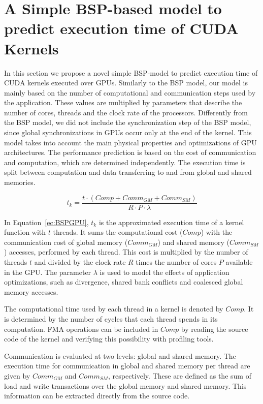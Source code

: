 \section[BSP-based model to predict execution time of CUDA Kernels]{A Simple BSP-based model to predict execution time of CUDA Kernels}\label{sec:proposeModel}

In this section we propose a novel simple BSP-model to predict execution time of CUDA kernels executed over GPUs. Similarly to the BSP model, our model is mainly based on the number of computational and communication steps used by the application. These values are multiplied by parameters that describe the number of cores, threads and the clock rate of the processors. Differently from the BSP model, we did not include the synchronization step of the BSP model, since global synchronizations in GPUs occur only at the end of the kernel. This model takes into account the main physical properties and optimizations of GPU architectures. The performance prediction is based on the cost of communication and computation, which are determined independently. The execution time is split between computation and data transferring to and from global and shared memories. 

\begin{equation}\label{ec:BSPGPU}
t_k = \frac{t \cdot (Comp + Comm_{GM} + Comm_{SM})}{R \cdot P \cdot \lambda}
\end{equation} 

In Equation~\ref{ec:BSPGPU}, $t_k$ is the approximated execution time of a kernel function with $t$ threads. It sums the computational cost ($Comp$) with the communication cost of global memory ($Comm_{GM}$) and shared memory ($Comm_{SM}$) accesses, performed by each thread. This cost is multiplied by the number of threads $t$ and divided by the clock rate $R$ times the number of cores $P$ available in the GPU. The parameter $\lambda$ is used to model the effects of application optimizations, such as divergence, shared bank conflicts and coalesced global memory accesses.

The computational time used by each thread in a kernel is denoted by $Comp$. It is determined by the number of cycles that each thread spends in its computation. FMA operations can be included in $Comp$ by reading the source code of the kernel and verifying this possibility with profiling tools. 

Communication is evaluated at two levels: global and shared memory. The execution time for communication in global and shared memory per thread are given by $Comm_{GM}$ and $Comm_{SM}$, respectively. These are defined as the sum of load and write transactions over the global memory and shared memory. This information can be extracted directly from the source code. %

